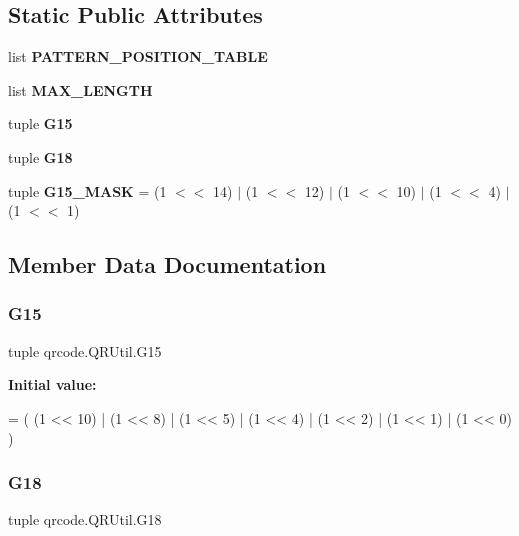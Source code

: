 \subsection*{Static Public Attributes}
\begin{DoxyCompactItemize}
\item 
\mbox{\label{classqrcode_1_1_q_r_util_ab1c302876bce3d594eb165721163fdaa}} 
list {\bfseries P\+A\+T\+T\+E\+R\+N\+\_\+\+P\+O\+S\+I\+T\+I\+O\+N\+\_\+\+T\+A\+B\+LE}
\item 
list {\bfseries M\+A\+X\+\_\+\+L\+E\+N\+G\+TH}
\item 
tuple {\bfseries G15}
\item 
tuple {\bfseries G18}
\item 
\mbox{\label{classqrcode_1_1_q_r_util_a56a47e488ae8d03d5a4ac7ef7c3bdb6b}} 
tuple {\bfseries G15\+\_\+\+M\+A\+SK} = (1 $<$$<$ 14) $\vert$ (1 $<$$<$ 12) $\vert$ (1 $<$$<$ 10) $\vert$ (1 $<$$<$ 4) $\vert$ (1 $<$$<$ 1)
\end{DoxyCompactItemize}


\subsection{Member Data Documentation}
\mbox{\label{classqrcode_1_1_q_r_util_aff9d50803d365a55ffcda8e9ea27a8db}} 
\subsubsection{\texorpdfstring{G15}{G15}}
{\footnotesize\ttfamily tuple qrcode.\+Q\+R\+Util.\+G15\hspace{0.3cm}{\ttfamily [static]}}

{\bfseries Initial value\+:}
\begin{DoxyCode}
=  ( (1 << 10) | (1 << 8) | (1 << 5) | (1 << 4) |
            (1 << 2) | (1 << 1) | (1 << 0) )
\end{DoxyCode}
\mbox{\label{classqrcode_1_1_q_r_util_a4766eadf2ee4d18a08363d6881bd6966}} 
\subsubsection{\texorpdfstring{G18}{G18}}
{\footnotesize\ttfamily tuple qrcode.\+Q\+R\+Util.\+G18\hspace{0.3cm}{\ttfamily [static]}}

